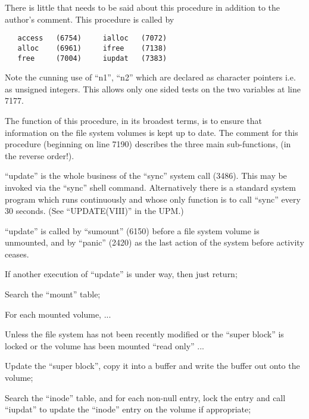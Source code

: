 
There is little that needs to be said
 about this procedure in addition to the
author's comment. This procedure is called by

\begin{verbatim}
   access   (6754)     ialloc   (7072)
   alloc    (6961)     ifree    (7138)
   free     (7004)     iupdat   (7383)
\end{verbatim}


Note the  cunning  use  of  ``n1'',  ``n2''
which   are   declared   as   character
pointers  i.e.  as  unsigned  integers.
This allows only one sided tests on the
two variables at line 7177.


The function of this procedure, in  its
broadest   terms,  is  to  ensure  that
information on the file system  volumes
is  kept  up  to date.  The comment for
this procedure (beginning on line 7190)
describes the three main sub-functions,
(in the reverse order!).

``update'' is the whole business  of  the
``sync''  system call (3486). This may be
invoked via the ``sync''  shell  command.
Alternatively  there is a standard system program
which runs continuously and
whose  only  function is to call ``sync''
every 30 seconds.  (See  ``UPDATE(VIII)''
in the UPM.)


``update'' is called by ``sumount''  (6150)
before   a   file   system   volume  is
unmounted, and by ``panic'' (2420) as the
last   action   of  the  system  before
activity ceases.

\bd
\item[7207:] If another execution of  ``update''
      is under way, then just return;

\item[7210:] Search the ``mount'' table;

\item[7211:] For each mounted volume, ...

\item[7213:] Unless the file  system  has  not
      been  recently  modified  or  the
      ``super block'' is  locked  or  the
      volume  has  been  mounted  ``read
      only'' ...

\item[7217:] Update the ``super block'', copy it
      into   a  buffer  and  write  the
      buffer out onto the volume;

\item[7223:] Search the ``inode'' table, and for
      each  non-null  entry,  lock  the
      entry and call ``iupdat'' to update
      the  ``inode''  entry on the volume
      if appropriate;

